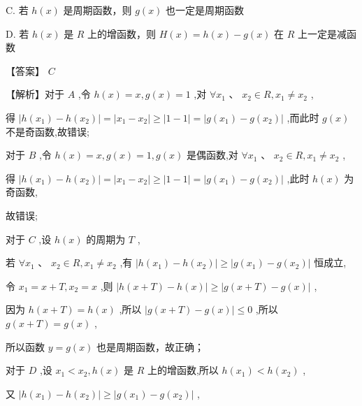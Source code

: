 \documentclass[10pt]{article}
\begin{document}
C. 若 \(h\left( x\right)\) 是周期函数，则 \(g\left( x\right)\) 也一定是周期函数

D. 若 \(h\left( x\right)\) 是 \(R\) 上的增函数，则 \(H\left( x\right)  = h\left( x\right)  - g\left( x\right)\) 在 \(R\) 上一定是减函数

【答案】 \(C\)

【解析】对于 \(A\) ,令 \(h\left( x\right)  = x,g\left( x\right)  = 1\) ,对 \(\forall {x}_{1}\text{ 、 }{x}_{2} \in  R,{x}_{1} \neq  {x}_{2}\) ,

得 \(\left| {h\left( {x}_{1}\right)  - h\left( {x}_{2}\right) }\right|  = \left| {{x}_{1} - {x}_{2}}\right|  \geq  \left| {1 - 1}\right|  = \left| {g\left( {x}_{1}\right)  - g\left( {x}_{2}\right) }\right|\) ,而此时 \(g\left( x\right)\) 不是奇函数,故错误;

对于 \(B\) ,令 \(h\left( x\right)  = x,g\left( x\right)  = 1,g\left( x\right)\) 是偶函数,对 \(\forall {x}_{1}\text{ 、 }{x}_{2} \in  R,{x}_{1} \neq  {x}_{2}\) ,

得 \(\left| {h\left( {x}_{1}\right)  - h\left( {x}_{2}\right) }\right|  = \left| {{x}_{1} - {x}_{2}}\right|  \geq  \left| {1 - 1}\right|  = \left| {g\left( {x}_{1}\right)  - g\left( {x}_{2}\right) }\right|\) ,此时 \(h\left( x\right)\) 为奇函数,

故错误;

对于 \(C\) ,设 \(h\left( x\right)\) 的周期为 \(T\) ,

若 \(\forall {x}_{1}\text{ 、 }{x}_{2} \in  R,{x}_{1} \neq  {x}_{2}\) ,有 \(\left| {h\left( {x}_{1}\right)  - h\left( {x}_{2}\right) }\right|  \geq  \left| {g\left( {x}_{1}\right)  - g\left( {x}_{2}\right) }\right|\) 恒成立,

令 \({x}_{1} = x + T,{x}_{2} = x\) ,则 \(\left| {h\left( {x + T}\right)  - h\left( x\right) }\right|  \geq  \left| {g\left( {x + T}\right)  - g\left( x\right) }\right|\) ,

因为 \(h\left( {x + T}\right)  = h\left( x\right)\) ,所以 \(\left| {g\left( {x + T}\right)  - g\left( x\right) }\right|  \leq  0\) ,所以 \(g\left( {x + T}\right)  = g\left( x\right)\) ,

所以函数 \(y = g\left( x\right)\) 也是周期函数，故正确；

对于 \(D\) ,设 \({x}_{1} < {x}_{2},h\left( x\right)\) 是 \(R\) 上的增函数,所以 \(h\left( {x}_{1}\right)  < h\left( {x}_{2}\right)\) ,

又 \(\left| {h\left( {x}_{1}\right)  - h\left( {x}_{2}\right) }\right|  \geq  \left| {g\left( {x}_{1}\right)  - g\left( {x}_{2}\right) }\right|\) ,
\end{document}
